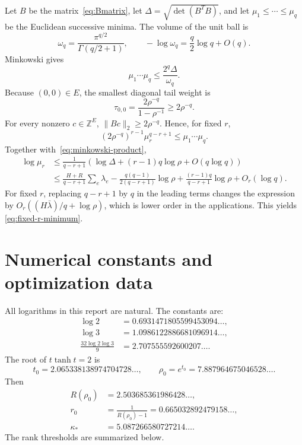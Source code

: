 \documentclass[11pt,oneside]{article}
\theoremstyle{definition}
\theoremstyle{remark}
\newcommand{\Z}{\mathbb Z}
\begin{document}
Let $B$ be the matrix~\eqref{eq:Bmatrix}, let $\Delta=\sqrt{\det(B^TB)}$, and let
$\mu_1\le\cdots\le\mu_q$ be the Euclidean successive minima.  The volume of the unit ball is
\[
 \omega_q=\frac{\pi^{q/2}}{\Gamma(q/2+1)},
 \qquad
 -\log\omega_q=\frac q2\log q+O(q).
\]
Minkowski gives
\begin{equation}
 \mu_1\cdots\mu_q\le\frac{2^q\Delta}{\omega_q}.
 \label{eq:minkowski-product}
\end{equation}
Because $(0,0)\in E$, the smallest diagonal tail weight is
\[
 \tau_{0,0}=\frac{2\rho^{-q}}{1-\rho^{-1}}\ge2\rho^{-q}.
\]
For every nonzero $c\in\Z^E$,
$\|Bc\|_2\ge2\rho^{-q}$.  Hence, for fixed $r$,
\[
 (2\rho^{-q})^{r-1}\mu_r^{q-r+1}
 \le\mu_1\cdots\mu_q.
\]
Together with~\eqref{eq:minkowski-product},
\begin{align*}
 \log\mu_r
 &\le\frac{1}{q-r+1}
 \left(\log\Delta+(r-1)q\log\rho+O(q\log q)\right)\\
 &\le\frac{H+R}{q-r+1}\sum_e\lambda_e
 -\frac{q(q-1)}{2(q-r+1)}\log\rho
 +\frac{(r-1)q}{q-r+1}\log\rho+O_r(\log q).
\end{align*}
For fixed $r$, replacing $q-r+1$ by $q$ in the leading terms changes the expression by
$O_r((H\bar\lambda)/q+\log\rho)$, which is lower order in the applications.  This yields
\eqref{eq:fixed-r-minimum}.

\section{Numerical constants and optimization data}
\label{app:constants}

All logarithms in this report are natural.  The constants are:
\begin{align*}
 \log2&=0.6931471805599453094\ldots,\\
 \log3&=1.0986122886681096914\ldots,\\
 \frac{32\log2\log3}{9}&=2.707555592600207\ldots.
\end{align*}
The root of $t\tanh t=2$ is
\[
 t_0=2.065338138974704728\ldots,
 \qquad
 \rho_0=e^{t_0}=7.887964675046528\ldots.
\]
Then
\begin{align*}
 R(\rho_0)&=2.503685361986428\ldots,\\
 r_0&=\frac1{R(\rho_0)-1}=0.665032892479158\ldots,\\
 \kappa_*&=5.087266580727214\ldots.
\end{align*}
The rank thresholds are summarized below.
\end{document}
